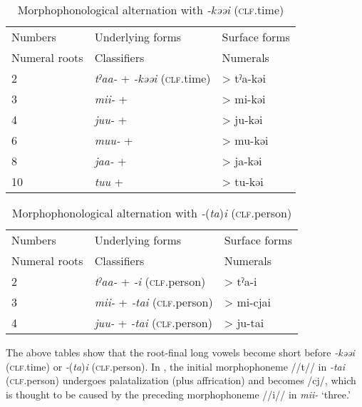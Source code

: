 \begin{table}
\caption{\label{tab:key:52} Morphophonological alternation with \textit{{}-kəəi} (\textsc{clf}.time)}
\begin{tabular}{lll}
\lsptoprule
Numbers & Underlying forms    & Surface forms\\
Numeral  roots  &  Classifiers    & Numerals\\
\midrule
2 & \textit{tˀaa-} +  \textit{{}-kəəi} (\textsc{clf}.time) & >  tˀa-kəi\\
3 & \textit{mii-}  +                                       & >  mi-kəi \\
4 & \textit{juu-}  +                                       & >  ju-kəi \\
6 & \textit{muu-}  +                                       & >  mu-kəi \\
8 & \textit{jaa-}  +                                       & >  ja-kəi \\
10&  \textit{tuu}  +                                       & >  tu-kəi \\
\end{tabular}

\end{table}

\begin{table}
\caption{\label{tab:key:53} Morphophonological alternation with \textit{{}-}(\textit{ta})\textit{i} (\textsc{clf}.person)}
\begin{tabular}{lll}
Numbers  & Underlying forms    & Surface forms\\
  Numeral roots    & Classifiers    & Numerals\\
\midrule
2  & \textit{tˀaa-}  +  \textit{{}-i} (\textsc{clf}.person)  &>  tˀa-i    \\
3  & \textit{mii-}  +  \textit{{}-tai} (\textsc{clf}.person) & >  mi-cjai \\
4  & \textit{juu-}  +  \textit{{}-tai} (\textsc{clf}.person) & >  ju-tai  \\
\end{tabular}
\end{table}

The above tables show that the root-final long vowels become short before \textit{{}-kəəi} (\textsc{clf}.time) or \textit{{}-}(\textit{ta})\textit{i} (\textsc{clf}.person). In , the initial morphophoneme //t// in \textit{{}-tai} (\textsc{clf}.person) undergoes palatalization (plus affrication) and becomes /cj/, which is thought to be caused by the preceding morphophoneme //i// in \textit{mii-} ‘three.’

